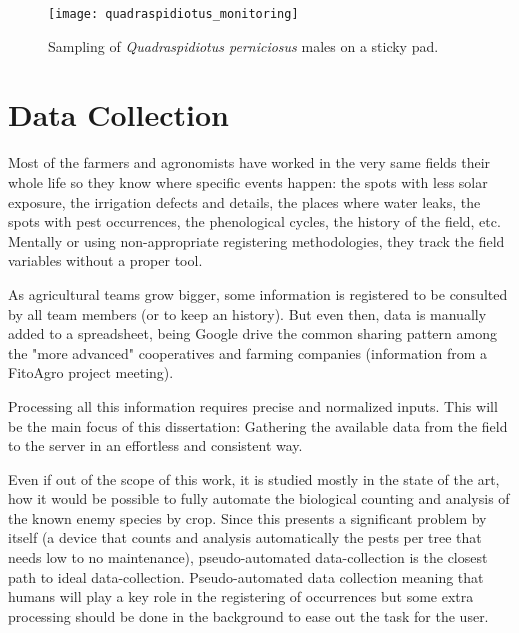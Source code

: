 \begin{figure}[htbp]
  \centering
  \texttt{[image: quadraspidiotus\_monitoring]}
  \caption{Sampling of \textit{Quadraspidiotus perniciosus} males on a sticky pad.}
  \label{fig:quadraspidiotus_monitoring}
\end{figure}

\section{Data Collection}
\label{sec:problem_data_collection}

Most of the farmers and agronomists have worked in the very same fields their whole life so they know where specific events happen: the spots with less solar exposure, the irrigation defects and details, the places where water leaks, the spots with pest occurrences, the phenological cycles, the history of the field, etc. Mentally or using non-appropriate registering methodologies, they track the field variables without a proper tool.

As agricultural teams grow bigger, some information is registered to be consulted by all team members (or to keep an history). But even then, data is manually added to a spreadsheet, being Google drive the common sharing pattern among the "more advanced" cooperatives and farming companies (information from a FitoAgro project meeting).

Processing all this information requires precise and normalized inputs. This will be the main focus of this dissertation: Gathering the available data from the field to the server in an effortless and consistent way.

Even if out of the scope of this work, it is studied mostly in the state of the art, how it would be possible to fully automate the biological counting and analysis of the known enemy species by crop. Since this presents a significant problem by itself (a device that counts and analysis automatically the pests per tree that needs low to no maintenance), pseudo-automated data-collection is the closest path to ideal data-collection. Pseudo-automated data collection meaning that humans will play a key role in the registering of occurrences but some extra processing should be done in the background to ease out the task for the user.
